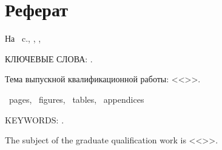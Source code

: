 \chapter*[Count-me]{Реферат} %
\thispagestyle{empty}%
%
%



На ~c.,  
,
,

{\MakeUppercase{Ключевые слова: \keywordsRu}.} %

Тема выпускной квалификационной работы: <<\thesisTitle>>.


\abstractRuStart %
\abstractRuList
\abstractRuEnd


\printTheAbstract %


~pages, 
~figures, 
~tables,
~appendices%

{\MakeUppercase{Keywords: \keywordsEn}.} %
	
The subject of the graduate qualification work is <<\thesisTitleEn>>.
	
	
\abstractEnStart %
\abstractEnList
\abstractEnEnd %
	


\thispagestyle{empty}
%
